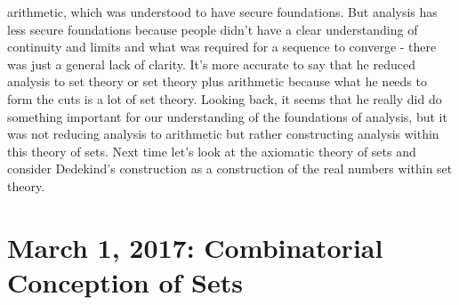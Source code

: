 \documentclass[12pt]{article}
\theoremstyle{definition}
\begin{document}
\begin{itemize}
        arithmetic, which was understood to have secure foundations. But
        analysis has less secure foundations because people didn't have a clear
        understanding of continuity and limits and what was required for a
        sequence to converge - there was just a general lack of clarity. It's
        more accurate to say that he reduced analysis to set theory or set
        theory plus arithmetic because what he needs to form the cuts is a lot
        of set theory. Looking back, it seems that he really did do something
        important for our understanding of the foundations of analysis, but it
        was not reducing analysis to arithmetic but rather constructing
        analysis within this theory of sets. Next time let's look at the
        axiomatic theory of sets and consider Dedekind's construction as a
        construction of the real numbers within set theory.

\end{itemize}

\section{March 1, 2017: Combinatorial Conception of Sets}
\end{document}
